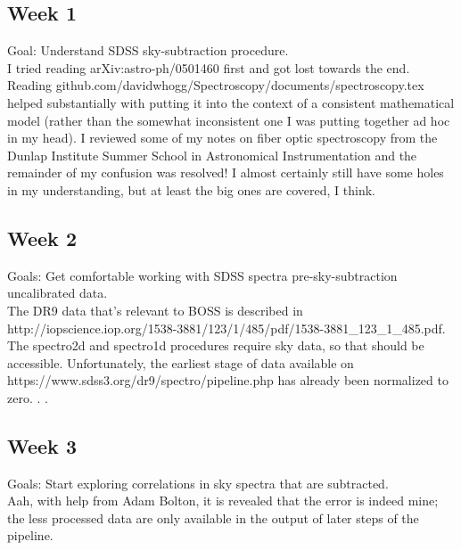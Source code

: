 \documentclass[12pt]{article}
\begin{document}
\subsection*{Week 1}
Goal: Understand SDSS sky-subtraction procedure.\\
\indent I tried reading arXiv:astro-ph/0501460 first and got lost towards the end.  Reading github.com/davidwhogg/Spectroscopy/documents/spectroscopy.tex helped substantially with putting it into the context of a consistent mathematical model (rather than the somewhat inconsistent one I was putting together ad hoc in my head).  I reviewed some of my notes on fiber optic spectroscopy from the Dunlap Institute Summer School in Astronomical Instrumentation and the remainder of my confusion was resolved!  I almost certainly still have some holes in my understanding, but at least the big ones are covered, I think.
\subsection*{Week 2}
Goals: Get comfortable working with SDSS spectra pre-sky-subtraction uncalibrated data.\\
\indent The DR9 data that's relevant to BOSS is described in http://iopscience.iop.org/1538-3881/123/1/485/pdf/1538-3881\_123\_1\_485.pdf.  The spectro2d and spectro1d procedures require sky data, so that should be accessible.  Unfortunately, the earliest stage of data available on https://www.sdss3.org/dr9/spectro/pipeline.php has already been normalized to zero. . .
\subsection*{Week 3}
Goals: Start exploring correlations in sky spectra that are subtracted.\\
Aah, with help from Adam Bolton, it is revealed that the error is indeed mine; the less processed data are only available in the output of later steps of the pipeline.
\end{document}
